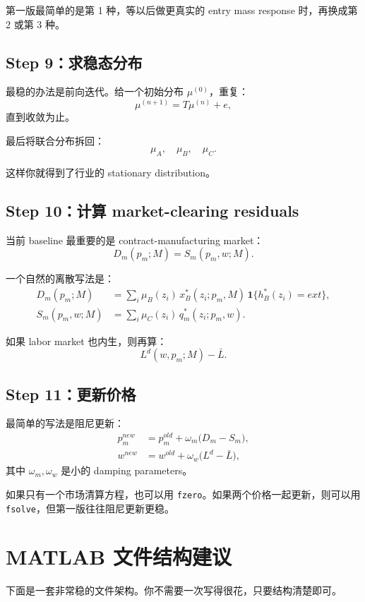 \documentclass[12pt]{ctexart}
\begin{document}
第一版最简单的是第 1 种，等以后做更真实的 entry mass response 时，再换成第 2 或第 3 种。

\subsection{Step 9：求稳态分布}

最稳的办法是前向迭代。给一个初始分布 $\mu^{(0)}$，重复：
\[
\mu^{(n+1)} = T\mu^{(n)} + e,
\]
直到收敛为止。

最后将联合分布拆回：
\[
\mu_A,\quad \mu_B,\quad \mu_C.
\]

这样你就得到了行业的 stationary distribution。

\subsection{Step 10：计算 market-clearing residuals}

当前 baseline 最重要的是 contract-manufacturing market：
\[
D_m(p_m;M)=S_m(p_m,w;M).
\]

一个自然的离散写法是：
\begin{align}
D_m(p_m;M)
&=
\sum_i \mu_B(z_i)\,x_B^*(z_i;p_m,M)\,\mathbf 1\{h_B^*(z_i)=ext\},
\\
S_m(p_m,w;M)
&=
\sum_i \mu_C(z_i)\,q_m^*(z_i;p_m,w).
\end{align}

如果 labor market 也内生，则再算：
\[
L^d(w,p_m;M)-\bar L.
\]

\subsection{Step 11：更新价格}

最简单的写法是阻尼更新：
\begin{align}
p_m^{new}&=p_m^{old}+\omega_m\big(D_m-S_m\big),\\
w^{new}&=w^{old}+\omega_w\big(L^d-\bar L\big),
\end{align}
其中 $\omega_m,\omega_w$ 是小的 damping parameters。

如果只有一个市场清算方程，也可以用 \texttt{fzero}。如果两个价格一起更新，则可以用 \texttt{fsolve}，但第一版往往阻尼更新更稳。

\section{MATLAB 文件结构建议}

下面是一套非常稳的文件架构。你不需要一次写得很花，只要结构清楚即可。
\end{document}
